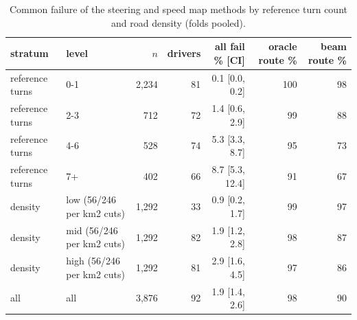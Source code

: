 \begin{table}[t]\centering\scriptsize\setlength{\tabcolsep}{3pt}
\caption{Common failure of the steering and speed map methods by reference turn count and road density (folds pooled).}\label{tab:supp_cfail}
\begin{tabular}{llrrrrr}\toprule
stratum & level & $n$ & drivers & all fail \% [CI] & oracle route \% & beam route \% \\\midrule
reference turns & 0-1 & 2{,}234 & 81 & 0.1 [0.0, 0.2] & 100 & 98 \\
reference turns & 2-3 & 712 & 72 & 1.4 [0.6, 2.9] & 99 & 88 \\
reference turns & 4-6 & 528 & 74 & 5.3 [3.3, 8.7] & 95 & 73 \\
reference turns & 7+ & 402 & 66 & 8.7 [5.3, 12.4] & 91 & 67 \\
density & low (56/246 per km2 cuts) & 1{,}292 & 33 & 0.9 [0.2, 1.7] & 99 & 97 \\
density & mid (56/246 per km2 cuts) & 1{,}292 & 82 & 1.9 [1.2, 2.8] & 98 & 87 \\
density & high (56/246 per km2 cuts) & 1{,}292 & 81 & 2.9 [1.6, 4.5] & 97 & 86 \\
all & all & 3{,}876 & 92 & 1.9 [1.4, 2.6] & 98 & 90 \\
\bottomrule\end{tabular}
\end{table}
